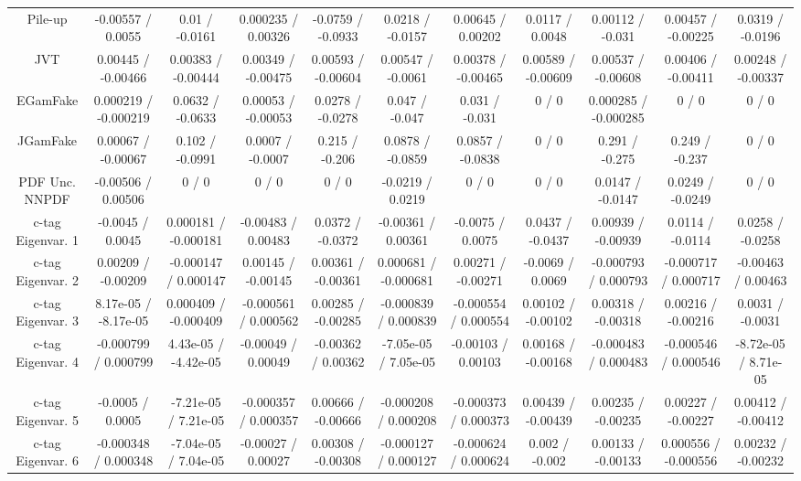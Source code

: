 {\begin{landscape}
\begin{longtable}{@{\extracolsep{\fill}}| *{11}{c|}}
  Pile-up & -0.00557 / 0.0055 & 0.01 / -0.0161 & 0.000235 / 0.00326 & -0.0759 / -0.0933 & 0.0218 / -0.0157 & 0.00645 / 0.00202 & 0.0117 / 0.0048 & 0.00112 / -0.031 & 0.00457 / -0.00225 & 0.0319 / -0.0196 \\ 
  JVT & 0.00445 / -0.00466 & 0.00383 / -0.00444 & 0.00349 / -0.00475 & 0.00593 / -0.00604 & 0.00547 / -0.0061 & 0.00378 / -0.00465 & 0.00589 / -0.00609 & 0.00537 / -0.00608 & 0.00406 / -0.00411 & 0.00248 / -0.00337 \\ 
  EGamFake & 0.000219 / -0.000219 & 0.0632 / -0.0633 & 0.00053 / -0.00053 & 0.0278 / -0.0278 & 0.047 / -0.047 & 0.031 / -0.031 & 0 / 0 & 0.000285 / -0.000285 & 0 / 0 & 0 / 0 \\ 
  JGamFake & 0.00067 / -0.00067 & 0.102 / -0.0991 & 0.0007 / -0.0007 & 0.215 / -0.206 & 0.0878 / -0.0859 & 0.0857 / -0.0838 & 0 / 0 & 0.291 / -0.275 & 0.249 / -0.237 & 0 / 0 \\ 
  PDF Unc. NNPDF & -0.00506 / 0.00506 & 0 / 0 & 0 / 0 & 0 / 0 & -0.0219 / 0.0219 & 0 / 0 & 0 / 0 & 0.0147 / -0.0147 & 0.0249 / -0.0249 & 0 / 0 \\ 
  c-tag Eigenvar. 1 & -0.0045 / 0.0045 & 0.000181 / -0.000181 & -0.00483 / 0.00483 & 0.0372 / -0.0372 & -0.00361 / 0.00361 & -0.0075 / 0.0075 & 0.0437 / -0.0437 & 0.00939 / -0.00939 & 0.0114 / -0.0114 & 0.0258 / -0.0258 \\ 
  c-tag Eigenvar. 2 & 0.00209 / -0.00209 & -0.000147 / 0.000147 & 0.00145 / -0.00145 & 0.00361 / -0.00361 & 0.000681 / -0.000681 & 0.00271 / -0.00271 & -0.0069 / 0.0069 & -0.000793 / 0.000793 & -0.000717 / 0.000717 & -0.00463 / 0.00463 \\ 
  c-tag Eigenvar. 3 & 8.17e-05 / -8.17e-05 & 0.000409 / -0.000409 & -0.000561 / 0.000562 & 0.00285 / -0.00285 & -0.000839 / 0.000839 & -0.000554 / 0.000554 & 0.00102 / -0.00102 & 0.00318 / -0.00318 & 0.00216 / -0.00216 & 0.0031 / -0.0031 \\ 
  c-tag Eigenvar. 4 & -0.000799 / 0.000799 & 4.43e-05 / -4.42e-05 & -0.00049 / 0.00049 & -0.00362 / 0.00362 & -7.05e-05 / 7.05e-05 & -0.00103 / 0.00103 & 0.00168 / -0.00168 & -0.000483 / 0.000483 & -0.000546 / 0.000546 & -8.72e-05 / 8.71e-05 \\ 
  c-tag Eigenvar. 5 & -0.0005 / 0.0005 & -7.21e-05 / 7.21e-05 & -0.000357 / 0.000357 & 0.00666 / -0.00666 & -0.000208 / 0.000208 & -0.000373 / 0.000373 & 0.00439 / -0.00439 & 0.00235 / -0.00235 & 0.00227 / -0.00227 & 0.00412 / -0.00412 \\ 
  c-tag Eigenvar. 6 & -0.000348 / 0.000348 & -7.04e-05 / 7.04e-05 & -0.00027 / 0.00027 & 0.00308 / -0.00308 & -0.000127 / 0.000127 & -0.000624 / 0.000624 & 0.002 / -0.002 & 0.00133 / -0.00133 & 0.000556 / -0.000556 & 0.00232 / -0.00232 \\ 

\end{longtable}
\end{landscape}}
